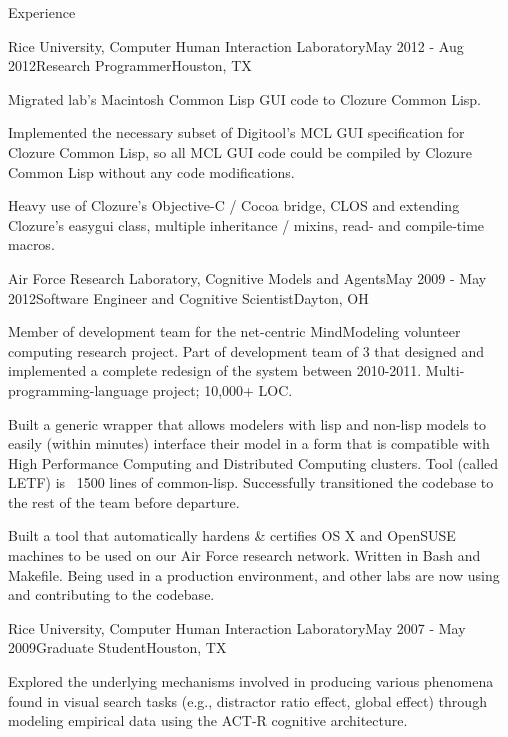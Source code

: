 \documentclass{resume} %
\begin{document}
\begin{rSection}{Experience}

\begin{rSubsection}{Rice University, Computer Human Interaction Laboratory}{May 2012 - Aug 2012}{Research Programmer}{Houston, TX}
\item Migrated lab's Macintosh Common Lisp GUI code to Clozure Common Lisp. 
\item Implemented the necessary subset of Digitool's MCL GUI specification for Clozure Common Lisp, so all MCL GUI code could be compiled by Clozure Common Lisp without any code modifications.
\item Heavy use of Clozure's Objective-C / Cocoa bridge, CLOS and extending Clozure's easygui class, multiple inheritance / mixins, read- and compile-time macros.
\end{rSubsection}

\begin{rSubsection}{Air Force Research Laboratory, Cognitive Models and Agents}{May 2009 - May 2012}{Software Engineer and Cognitive Scientist}{Dayton, OH}
\item Member of development team for the net-centric MindModeling volunteer computing research project.
Part of development team of 3 that designed and implemented a complete redesign of the system between 2010-2011.
Multi-programming-language project; 10,000+ LOC.
\item Built a generic wrapper that allows modelers with lisp and non-lisp models to easily
(within minutes) interface their model in a form that is compatible with High Performance Computing and Distributed Computing clusters.
Tool (called LETF) is ~1500 lines of common-lisp. Successfully transitioned the codebase to the rest of the team before departure.
\item Built a tool that automatically hardens \& certifies OS X and OpenSUSE machines to be used on our Air Force research network.
Written in Bash and Makefile.
Being used in a production environment, and other labs are now using and contributing to the codebase.
\end{rSubsection}

\begin{rSubsection}{Rice University, Computer Human Interaction Laboratory}{May 2007 - May 2009}{Graduate Student}{Houston, TX}
\item Explored the underlying mechanisms involved in producing various phenomena found in visual search tasks
(e.g., distractor ratio effect, global effect) through modeling empirical data using the ACT-R cognitive architecture. 
\end{rSubsection}


\end{rSection}
\end{document}
